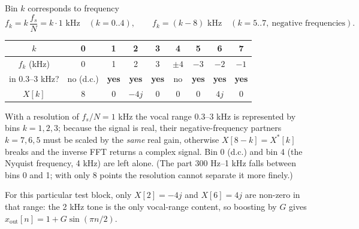 \begin{solution}
 Bin $k$ corresponds to frequency
\[f_k=k\,\frac{f_s}{N}=k\cdot1\text{ kHz}\quad(k=0..4),\qquad f_k=(k-8)\text{ kHz}\quad(k=5..7,\ \text{negative frequencies}).\]
\begin{center}\small\renewcommand{\arraystretch}{1.25}\begin{tabular}{@{}c|cccccccc@{}}
$k$&0&1&2&3&4&5&6&7\\\hline
$f_k$ (kHz)&0&1&2&3&$\pm4$&$-3$&$-2$&$-1$\\
in 0.3--3 kHz?&no (d.c.)&\textbf{yes}&\textbf{yes}&\textbf{yes}&no&\textbf{yes}&\textbf{yes}&\textbf{yes}\\
$X[k]$&8&0&$-4j$&0&0&0&$4j$&0\end{tabular}\end{center}
With a resolution of $f_s/N=1$ kHz the vocal range 0.3--3 kHz is represented by bins $k=1,2,3$; because the signal is real, their negative-frequency partners $k=7,6,5$ must be scaled by the \emph{same} real gain, otherwise $X[8-k]=X^*[k]$ breaks and the inverse FFT returns a complex signal. Bin 0 (d.c.) and bin 4 (the Nyquist frequency, 4 kHz) are left alone. (The part 300 Hz--1 kHz falls between bins 0 and 1; with only 8 points the resolution cannot separate it more finely.)

For this particular test block, only $X[2]=-4j$ and $X[6]=4j$ are non-zero in that range: the 2 kHz tone is the only vocal-range content, so boosting by $G$ gives $x_{\text{out}}[n]=1+G\sin(\pi n/2)$.
\end{solution}
